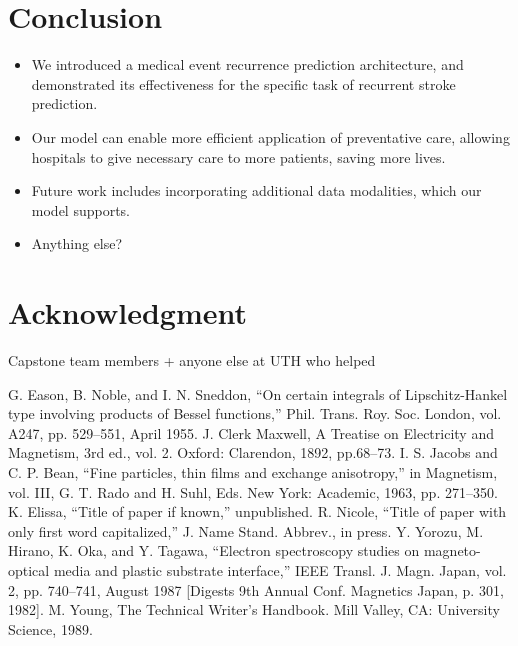 \documentclass[conference]{IEEEtran}
\begin{document}
\section{Conclusion}

\begin{itemize}
    \item We introduced a medical event recurrence prediction architecture, and demonstrated its effectiveness for the specific task of recurrent stroke prediction.
    \item Our model can enable more efficient application of preventative care, allowing hospitals to give necessary care to more patients, saving more lives.
    \item Future work includes incorporating additional data modalities, which our model supports.
    \item {\color{red} Anything else?}
\end{itemize}

\section*{Acknowledgment}

Capstone team members + anyone else at UTH who helped

\begin{thebibliography}{00}
 G. Eason, B. Noble, and I. N. Sneddon, ``On certain integrals of Lipschitz-Hankel type involving products of Bessel functions,'' Phil. Trans. Roy. Soc. London, vol. A247, pp. 529--551, April 1955.
 J. Clerk Maxwell, A Treatise on Electricity and Magnetism, 3rd ed., vol. 2. Oxford: Clarendon, 1892, pp.68--73.
 I. S. Jacobs and C. P. Bean, ``Fine particles, thin films and exchange anisotropy,'' in Magnetism, vol. III, G. T. Rado and H. Suhl, Eds. New York: Academic, 1963, pp. 271--350.
 K. Elissa, ``Title of paper if known,'' unpublished.
 R. Nicole, ``Title of paper with only first word capitalized,'' J. Name Stand. Abbrev., in press.
 Y. Yorozu, M. Hirano, K. Oka, and Y. Tagawa, ``Electron spectroscopy studies on magneto-optical media and plastic substrate interface,'' IEEE Transl. J. Magn. Japan, vol. 2, pp. 740--741, August 1987 [Digests 9th Annual Conf. Magnetics Japan, p. 301, 1982].
 M. Young, The Technical Writer's Handbook. Mill Valley, CA: University Science, 1989.
\end{thebibliography}
\end{document}
